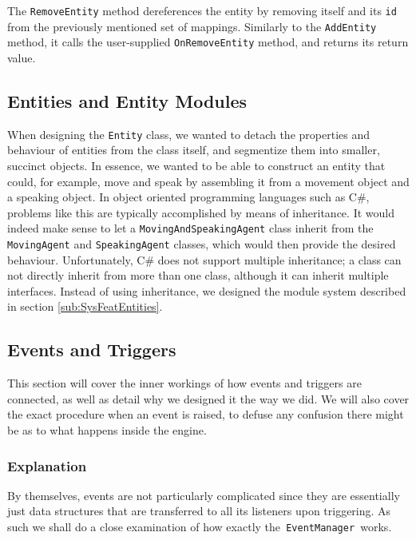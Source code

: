 The \texttt{RemoveEntity} method dereferences the entity by removing
itself and its \texttt{id} from the previously mentioned set of mappings.
Similarly to the \texttt{AddEntity} method, it calls the user-supplied
\texttt{OnRemoveEntity} method, and returns its return value. 


\subsection{Entities and Entity Modules}

When designing the \texttt{Entity} class, we wanted to detach the
properties and behaviour of entities from the class itself, and segmentize
them into smaller, succinct objects. In essence, we wanted to be able
to construct an entity that could, for example, move and speak by
assembling it from a movement object and a speaking object. In object
oriented programming languages such as C\#, problems like this are
typically accomplished by means of inheritance. It would indeed make
sense to let a \texttt{MovingAndSpeakingAgent} class inherit from
the \texttt{MovingAgent} and \texttt{SpeakingAgent} classes, which
would then provide the desired behaviour. Unfortunately, C\# does
not support multiple inheritance; a class can not directly inherit
from more than one class, although it can inherit multiple interfaces.
Instead of using inheritance, we designed the module system described
in section \ref{sub:SysFeatEntities}.


\subsection{Events and Triggers\label{sub:ImplementationEventsTriggers}}

This section will cover the inner workings of how events and triggers
are connected, as well as detail why we designed it the way we did.
We will also cover the exact procedure when an event is raised, to
defuse any confusion there might be as to what happens inside the
engine.


\subsubsection*{Explanation}

By themselves, events are not particularly complicated since they
are essentially just data structures that are transferred to all its
listeners upon triggering. As such we shall do a close examination
of how exactly the\texttt{ EventManager }works.

